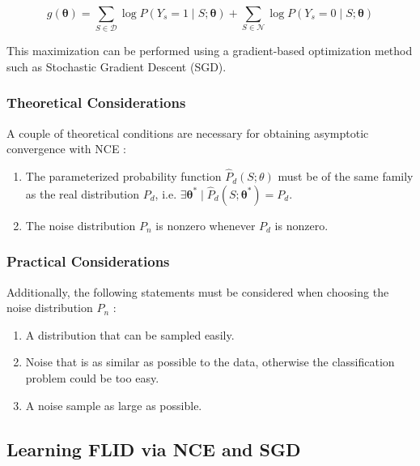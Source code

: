 \begin{equation}
\label{eq:log-likelihood}
g(\boldsymbol{\theta}) = \sum_{S \in \mathcal{D}}{\log{P(Y_{s} = 1 \mid S;\boldsymbol{\theta})}} + \sum_{S \in \mathcal{N}}{\log{P(Y_{s} = 0 \mid S;\boldsymbol{\theta})}}
\end{equation}

This maximization can be performed using a gradient-based optimization method such as Stochastic Gradient Descent (SGD).

\subsubsection{Theoretical Considerations}
\label{sec:nce-theoretical}

A couple of theoretical conditions are necessary for obtaining asymptotic convergence with NCE \citep{Gutmann12NCE}:

\begin{enumerate}
  \item The parameterized probability function $\hat{P}_{d}(S;\theta)$ must be of the same family as the real distribution $P_{d}$, i.e. $\exists \boldsymbol{\theta}^{*} \mid \hat{P}_{d}(S;\boldsymbol{\theta}^{*}) = P_{d}$.
  \item The noise distribution $P_{n}$ is nonzero whenever $P_{d}$ is nonzero.
\end{enumerate}

\subsubsection{Practical Considerations}
\label{sec:nce-practical}

Additionally, the following statements must be considered when choosing the noise distribution $P_{n}$ \citep{Gutmann12NCE}:

\begin{enumerate}
  \item A distribution that can be sampled easily.
  \item Noise that is as similar as possible to the data, otherwise the classification problem could be too easy.
  \item A noise sample as large as possible.
\end{enumerate}

\subsection{Learning FLID via NCE and SGD}

